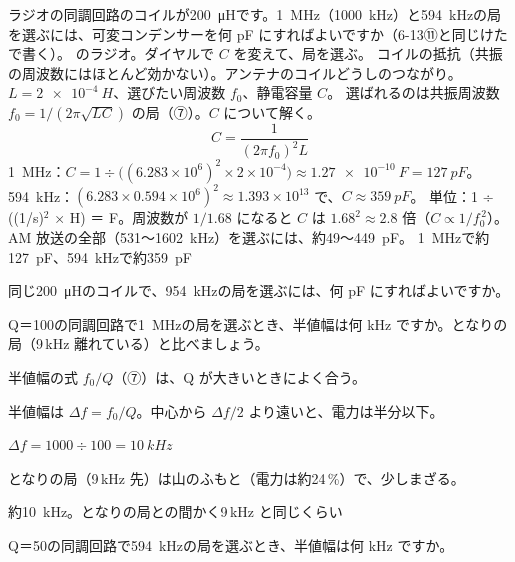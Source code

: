 \begin{phreidai}[ラジオの同調に必要な静電容量]
\label{ph:電-10:ex7}ラジオの同調回路のコイルが\qty{200}{\micro H}です。\qty{1}{MHz}（\qty{1000}{kHz}）と\qty{594}{kHz}の局を選ぶには、可変コンデンサーを何 pF にすればよいですか（6-13⑪と同じけたで書く）。
\phbamen
\bkhatenaref のラジオ。ダイヤルで $C$ を変えて、局を選ぶ。
\phmushi
コイルの抵抗（共振の周波数にはほとんど効かない）。アンテナのコイルどうしのつながり。
\phzu
$L=\qty{2e-4}{H}$、選びたい周波数 $f_0$、静電容量 $C$。
\phriyu
選ばれるのは共振周波数 $f_0=1/(2\pi\sqrt{LC})$ の局（⑦）。$C$ について解く。
\phtateru
\[ C=\frac{1}{(2\pi f_0)^2L} \]
\phtoku
\qty{1}{MHz}：$C=1\div\bigl((6.283\times10^6)^2\times2\times10^{-4}\bigr)\approx\qty{1.27e-10}{F}=\qty{127}{pF}$。\qty{594}{kHz}：$(6.283\times0.594\times10^6)^2\approx1.393\times10^{13}$ で、$C\approx\qty{359}{pF}$。
\phtashikame
単位：1 ÷ ((1/s)$^2$ × H) ＝ F。周波数が $1/1.68$ になると $C$ は $1.68^2\approx2.8$ 倍（$C\propto1/f_0^{\,2}$）。AM 放送の全部（531〜\qty{1602}{kHz}）を選ぶには、約49〜\qty{449}{pF}。
\kotae \qty{1}{MHz}で約\qty{127}{pF}、\qty{594}{kHz}で約\qty{359}{pF}
\end{phreidai}
\begin{jibun}
同じ\qty{200}{\micro H}のコイルで、\qty{954}{kHz}の局を選ぶには、何 pF にすればよいですか。
\end{jibun}

\begin{reidai}[Q 値と、となりの局]
\label{ph:電-10:ex8}Q＝100の同調回路で\qty{1}{MHz}の局を選ぶとき、半値幅は何 kHz ですか。となりの局（9\,kHz 離れている）と比べましょう。
\par{} 半値幅の式 $f_0/Q$（⑦）は、Q が大きいときによく合う。
\par\kangaekata 半値幅は $\Delta f=f_0/Q$。中心から $\Delta f/2$ より遠いと、電力は半分以下。
\par\shiki $\Delta f=1000\div100=\qty{10}{kHz}$
\par{} となりの局（9\,kHz 先）は山のふもと（電力は約24\,\%）で、少しまざる。
\par\kotae 約\qty{10}{kHz}。となりの局との間かく9\,kHz と同じくらい
\end{reidai}
\begin{jibun}
Q＝50の同調回路で\qty{594}{kHz}の局を選ぶとき、半値幅は何 kHz ですか。
\end{jibun}

